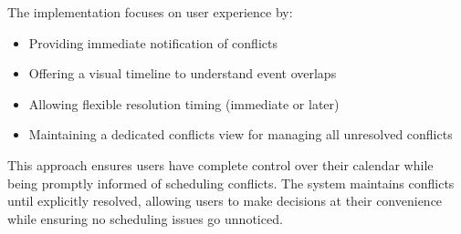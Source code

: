 The implementation focuses on user experience by:
\begin{itemize}
	\item Providing immediate notification of conflicts
	\item Offering a visual timeline to understand event overlaps
	\item Allowing flexible resolution timing (immediate or later)
	\item Maintaining a dedicated conflicts view for managing all unresolved conflicts
\end{itemize}

This approach ensures users have complete control over their calendar while being promptly informed of scheduling conflicts. The system maintains conflicts until explicitly resolved, allowing users to make decisions at their convenience while ensuring no scheduling issues go unnoticed.